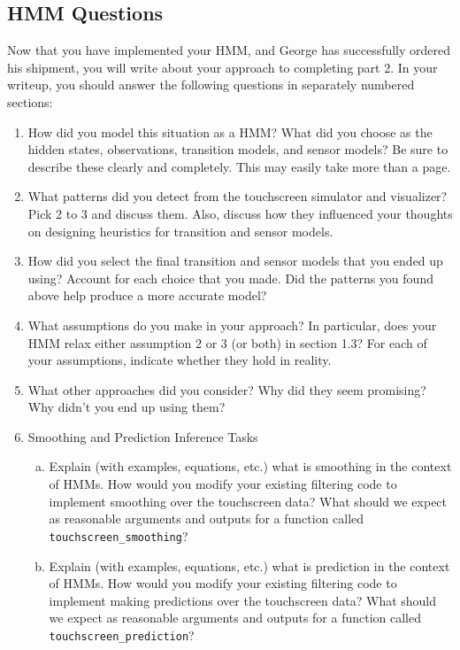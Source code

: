 \documentclass{article}
\begin{document}
\subsection{HMM Questions}
Now that you have implemented your HMM, and George has successfully ordered his shipment, you will write about your approach to completing part 2. In your writeup, you should answer the following questions in separately numbered sections:
\begin{enumerate}
\item How did you model this situation as a HMM? What did you choose as the hidden states, observations, transition models, and sensor models? Be sure to describe these clearly and completely. This may easily take more than a page.

\item What patterns did you detect from the touchscreen simulator and visualizer? Pick 2 to 3 and discuss them. Also, discuss how they influenced your thoughts on designing heuristics for transition and sensor models.

\item How did you select the final transition and sensor models that you ended up using? Account for each choice that you made. Did the patterns you found above help produce a more accurate model?

\item What assumptions do you make in your approach? In particular, does your HMM relax either assumption 2 or 3 (or both) in section 1.3? For each of your assumptions, indicate whether they hold in reality.
\item What other approaches did you consider? Why did they seem promising? Why didn’t you end up using them?
\item Smoothing and Prediction Inference Tasks
    \begin{enumerate}[(a)]
        \item Explain (with examples, equations, etc.) what is smoothing in the context of HMMs. How would you modify your existing filtering code to implement smoothing over the touchscreen data? What should we expect as reasonable arguments and outputs for a function called \texttt{touchscreen\_smoothing}?
        \item Explain (with examples, equations, etc.) what is prediction in the context of HMMs. How would you modify your existing filtering code to implement making predictions over the touchscreen data? What should we expect as reasonable arguments and outputs for a function called \texttt{touchscreen\_prediction}?
    \end{enumerate}
    

\end{enumerate}
\end{document}
